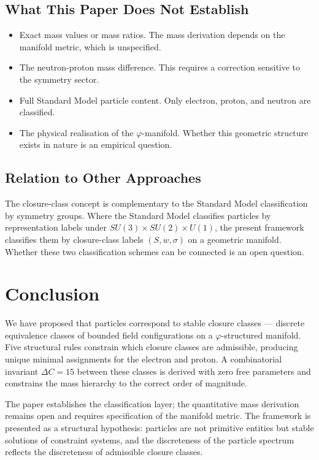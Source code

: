 \documentclass[12pt]{article}
\newcommand{\phig}{\varphi}
\begin{document}
\subsection{What This Paper Does Not Establish}

\begin{itemize}
    \item Exact mass values or mass ratios. The mass derivation depends on the manifold metric, which is unspecified.
    \item The neutron-proton mass difference. This requires a correction sensitive to the symmetry sector.
    \item Full Standard Model particle content. Only electron, proton, and neutron are classified.
    \item The physical realisation of the $\phig$-manifold. Whether this geometric structure exists in nature is an empirical question.
\end{itemize}

\subsection{Relation to Other Approaches}

The closure-class concept is complementary to the Standard Model classification by symmetry groups. Where the Standard Model classifies particles by representation labels under $SU(3) \times SU(2) \times U(1)$, the present framework classifies them by closure-class labels $(S, w, \sigma)$ on a geometric manifold. Whether these two classification schemes can be connected is an open question.

\section{Conclusion}\label{sec:conclusion}

We have proposed that particles correspond to stable closure classes --- discrete equivalence classes of bounded field configurations on a $\phig$-structured manifold. Five structural rules constrain which closure classes are admissible, producing unique minimal assignments for the electron and proton. A combinatorial invariant $\Delta C = 15$ between these classes is derived with zero free parameters and constrains the mass hierarchy to the correct order of magnitude.

The paper establishes the classification layer; the quantitative mass derivation remains open and requires specification of the manifold metric. The framework is presented as a structural hypothesis: particles are not primitive entities but stable solutions of constraint systems, and the discreteness of the particle spectrum reflects the discreteness of admissible closure classes.
\end{document}
